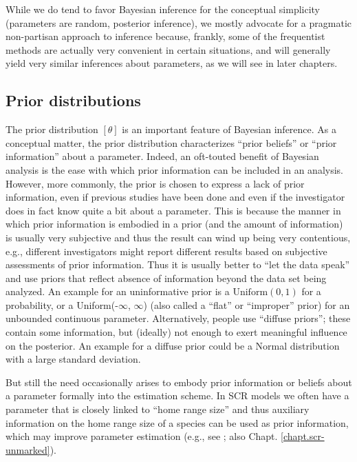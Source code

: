 While we do tend to favor Bayesian inference for the conceptual
simplicity (parameters are random, posterior inference), we mostly
advocate for a pragmatic non-partisan approach to inference because,
frankly, some of the frequentist methods are actually very
convenient in certain situations, and will generally yield very
similar inferences about parameters, as we will see in later chapters.


\subsection{Prior distributions}

The prior distribution $[\theta]$ is an important feature of Bayesian
inference. As a conceptual matter,
the prior distribution characterizes ``prior beliefs'' or ``prior
information'' about a parameter. Indeed,
an oft-touted benefit of Bayesian analysis is the ease with which
prior information can be included in an analysis. 
However, more commonly, the prior is chosen to
express a lack of prior information, even if previous studies have
been done and even if the investigator does in fact know quite a bit
about a parameter.
This is because
the manner in which prior information is embodied in a prior (and the
amount of information) is
usually very subjective and thus the result can wind up being very
contentious, e.g., different investigators might report different
results based on subjective assessments of prior information. Thus it is usually
better to ``let the data speak'' and use priors that reflect absence
of information beyond the data set being analyzed. An example for an
uninformative prior is a $\mbox{Uniform}(0,1)$ for a probability, or a
\mbox{Uniform}(-$\infty$, $\infty$) (also called a ``flat'' or
``improper'' prior) for an unbounded continuous
parameter. Alternatively, people use ``diffuse priors''; these contain
some information, but (ideally) not enough to exert meaningful
influence on the posterior. An example for a diffuse prior could be a Normal distribution with a large standard deviation.

But still the need occasionally arises to embody prior information or
beliefs about a parameter formally into the estimation scheme.
 In SCR models we often have a parameter that is closely linked
to ``home range size'' and thus auxiliary information on the home
range size of a species can be used as prior information, which may improve parameter estimation (e.g., see
\citet{chandler_royle:2012}; also Chapt. \ref{chapt.scr-unmarked}).

